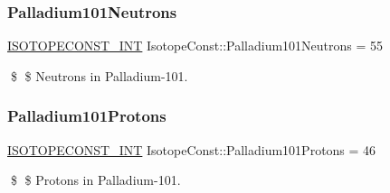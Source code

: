 \subsubsection{\texorpdfstring{Palladium101\+Neutrons}{Palladium101Neutrons}}
{\footnotesize\ttfamily \mbox{\hyperlink{group___isotope_const-_macros_ga5f18360b3e99483a35c32d789e62621c}{I\+S\+O\+T\+O\+P\+E\+C\+O\+N\+S\+T\+\_\+\+I\+NT}} Isotope\+Const\+::\+Palladium101\+Neutrons = 55}

\$ \$ Neutrons in Palladium-\/101. \mbox{\label{group___isotope_const-_palladium-_pd101_ga424fb5b5213aac6427fafd41e56fe345}} 
\subsubsection{\texorpdfstring{Palladium101\+Protons}{Palladium101Protons}}
{\footnotesize\ttfamily \mbox{\hyperlink{group___isotope_const-_macros_ga5f18360b3e99483a35c32d789e62621c}{I\+S\+O\+T\+O\+P\+E\+C\+O\+N\+S\+T\+\_\+\+I\+NT}} Isotope\+Const\+::\+Palladium101\+Protons = 46}

\$ \$ Protons in Palladium-\/101. 